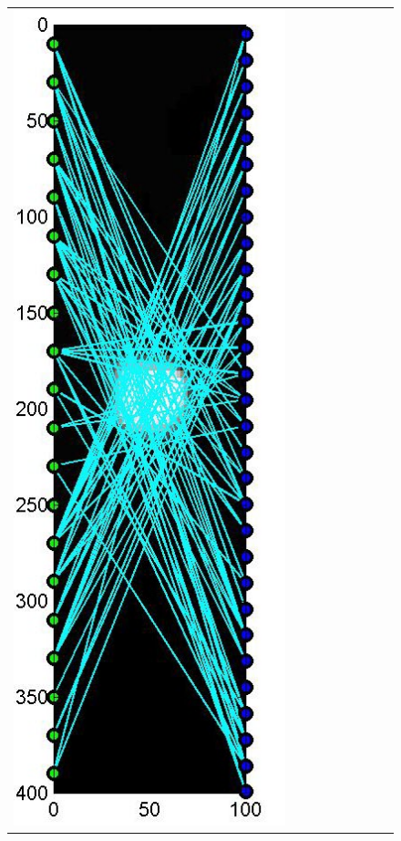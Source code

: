 \documentclass[english]{siamltex}
\begin{document}
{\begin{figure}[!h]
\begin{center}
\begin{tabular}{|c|c|c|c|c|c|c|c|c|}
			\includegraphics[width=.9\iwidth]{figures/newFigs/noisy/resultsExp-4-designs}
			&

\end{tabular}
\end{center}
\end{figure}}
\end{document}
